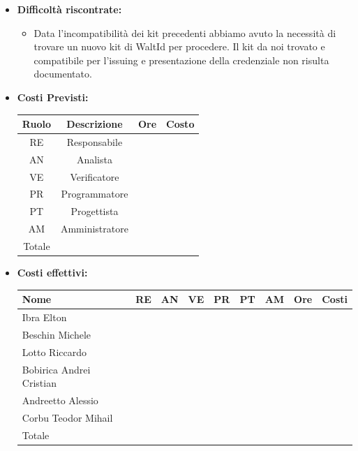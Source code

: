 \begin{itemize}
\begin{itemize}
                
            \end{itemize}
            \item \textbf{Difficoltà riscontrate:}
             \begin{itemize}
                \item  Data l'incompatibilità dei kit precedenti abbiamo avuto la necessità di trovare un nuovo kit di WaltId per procedere. Il kit da noi trovato e compatibile per l'issuing e presentazione della credenziale non risulta documentato.
             \end{itemize}
            \item \textbf{Costi Previsti:}
            \begin{longtable}{|c|c|c|c|}
                \hline
                Ruolo & Descrizione & Ore & Costo \\
                \hline
                RE & Responsabile &  &  \\
                \hline
                AN & Analista &  &  \\
                \hline
                VE & Verificatore &  &  \\
                \hline
                PR & Programmatore &  &  \\
                \hline
                PT & Progettista &  &  \\
                \hline
                AM & Amministratore &  &  \\
                \hline
                Totale & &  &  \\
                \hline
                \end{longtable}
            \item \textbf{Costi effettivi:}
            \begin{longtable}{|p{}|c|c|c|c|c|c|c|c|}
                \hline
                Nome & RE & AN & VE & PR & PT & AM & Ore & Costi\\
                \hline
                Ibra \newline Elton & & & & & & & & \\
                \hline
                Beschin Michele & & & & & & & & \\
                \hline
                Lotto \newline Riccardo & & & & & & & & \\
                \hline
                Bobirica Andrei Cristian & & & & & & & & \\
                \hline
                Andreetto Alessio & & & & & & & & \\
                \hline
                Corbu Teodor Mihail & & & & & & & & \\
                \hline
                Totale & & & & & & & & \\
                \hline
            \end{longtable}
            \end{itemize}


